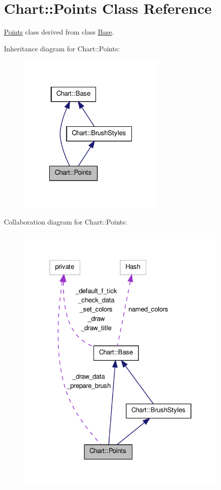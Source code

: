 \hypertarget{classChart_1_1Points}{
\section{Chart::Points Class Reference}
\label{classChart_1_1Points}
}


\hyperlink{classChart_1_1Points}{Points} class derived from class \hyperlink{classChart_1_1Base}{Base}.  




Inheritance diagram for Chart::Points:\nopagebreak
\begin{figure}[H]
\begin{center}
\leavevmode
\includegraphics[width=204pt]{classChart_1_1Points__inherit__graph}
\end{center}
\end{figure}


Collaboration diagram for Chart::Points:\nopagebreak
\begin{figure}[H]
\begin{center}
\leavevmode
\includegraphics[width=295pt]{classChart_1_1Points__coll__graph}
\end{center}
\end{figure}
